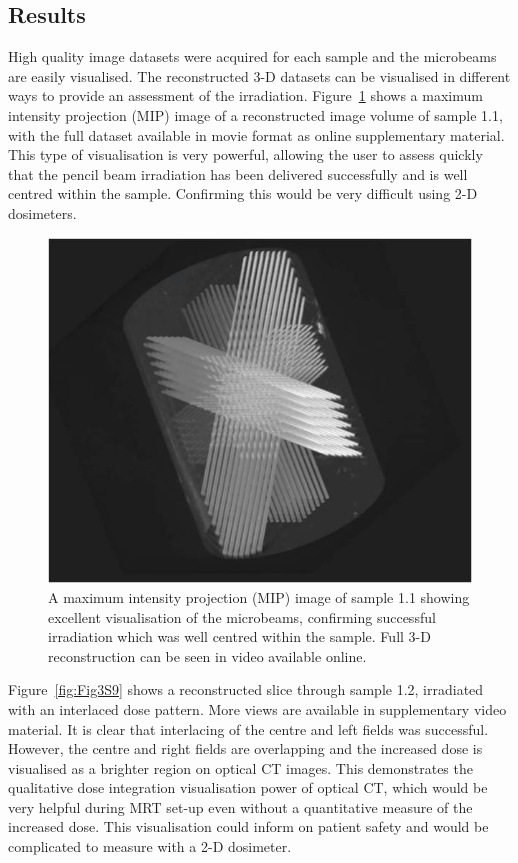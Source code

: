 	
	
	\subsection{Results}
	High quality image datasets were acquired for each sample and the microbeams are easily visualised. The reconstructed 3-D datasets can be visualised in different ways to provide an assessment of the irradiation. Figure~\ref{fig:Fig2MIP} shows a maximum intensity projection (MIP) image of a reconstructed image volume of sample 1.1, with the full dataset available in movie format as online supplementary material. This type of visualisation is very powerful, allowing the user to assess quickly that the pencil beam irradiation has been delivered successfully and is well centred within the sample. Confirming this would be very difficult using 2-D dosimeters. 
	
	\begin{figure}
		\centering
		\includegraphics[width=0.7\linewidth]{mrt_img/mrt_Fig2}
		\caption{A maximum intensity projection (MIP) image of sample 1.1 showing excellent visualisation of the microbeams, confirming successful irradiation which was well centred within the sample. Full 3-D reconstruction can be seen in video available online.}
		\label{fig:Fig2MIP}
	\end{figure}
	
	
	Figure~\ref{fig:Fig3S9} shows a reconstructed slice through sample 1.2, irradiated with an interlaced dose pattern. More views are available in supplementary video material. It is clear that interlacing of the centre and left fields was successful. However, the centre and right fields are overlapping and the increased dose is visualised as a brighter region on optical CT images. This demonstrates the qualitative dose integration visualisation power of optical CT, which would be very helpful during MRT set-up even without a quantitative measure of the increased dose. This visualisation could inform on patient safety and would be complicated to measure with a 2-D dosimeter. 
	

